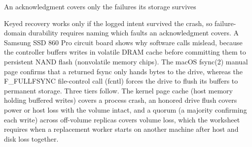 \documentclass[aspectratio=169, 12pt]{beamer}
\begin{document}
\begin{frame}{An acknowledgment covers only the failures its storage survives}
{    Keyed recovery works only if the logged intent survived the crash, so failure-domain durability requires naming which faults an acknowledgment covers. A Samsung SSD 860 Pro circuit board shows why software calls mislead, because the controller buffers writes in volatile DRAM cache before committing them to persistent NAND flash (nonvolatile memory chips). The macOS fsync(2) manual page confirms that a returned fsync only hands bytes to the drive, whereas the F\_FULLFSYNC file-control call (fcntl) forces the drive to flush its buffers to permanent storage. Three tiers follow. The kernel page cache (host memory holding buffered writes) covers a process crash, an honored drive flush covers power or host loss with the volume intact, and a quorum (a majority confirming each write) across off-volume replicas covers volume loss, which the worksheet requires when a replacement worker starts on another machine after host and disk loss together.


  }
\end{frame}
\end{document}
